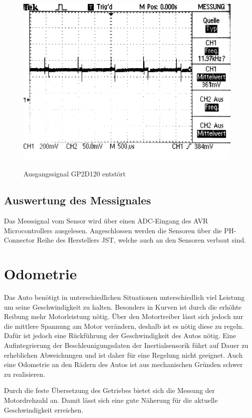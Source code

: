 \begin{figure}[H]
\centering
\includegraphics[width=.8\textwidth]{IR_lessspikes.png}\\
\caption{Ausgangssignal GP2D120 entstört}%
\label{fig:IR_lessspikes}
\end{figure}

\subsection{Auswertung des Messignales}
Das Messsignal vom Sensor wird über einen ADC-Eingang des AVR Microcontrollers ausgelesen. Angeschlossen werden die Sensoren über die PH-Connector Reihe des Herstellers JST, welche auch an den Sensoren verbaut sind.



\section{Odometrie}
Das Auto benötigt in unterschiedlichen Situationen unterschiedlich viel Leistung um seine Geschwindigkeit zu halten.
Besonders in Kurven ist durch die erhöhte Reibung mehr Motorleistung nötig. Über den Motortreiber lässt sich jedoch nur
die mittlere Spannung am Motor verändern, deshalb ist es nötig diese zu regeln. Dafür ist jedoch eine Rückführung der Geschwindigkeit
des Autos nötig. Eine Aufintegrierung der Beschleunigungsdaten der Inertialsensorik führt auf Dauer zu erheblichen
Abweichungen und ist daher für eine Regelung nicht geeignet. Auch eine Odometrie an den Rädern des Autos ist
aus mechanischen Gründen schwer zu realisieren. 

Durch die feste Übersetzung des Getriebes bietet sich die Messung der Motordrehzahl an. Damit lässt sich eine gute Näherung für die aktuelle Geschwindigkeit erreichen. 

